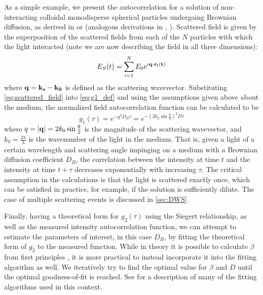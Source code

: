 As a simple example, we present the autocorrelation for a solution of non-interacting colloidal monodisperse spherical particles undergoing Brownian diffusion, as derived in \cite[ch. 16.2.2]{Brown1993} or \cite{Boas1997} (analogous derivations in \cite{BernePecora1976}, \cite{Schmitz1990}). Scattered field is given by the superposition of the scattered fields from each of the $N$ particles with which the light interacted (note we are now describing the field in all three dimensions):
\begin{equation} \label{eq:scattered_field}
E_S(t) = \sum_{i=1}^{N} E_0 e^{i\vb{q}\cdot\vb{r_i(t)}}
\end{equation}
where $\vb{q}=\vb{k_s}-\vb{k_0}$ is defined as the scattering wavevector. Substituting \autoref{eq:scattered_field} into \autoref{eq:g1_def} and using the assumptions given above about the medium, the normalized field autocorrelation function can be calculated to be 
\begin{equation} \label{eq:g1_dls}
g_1(\tau) = e^{-q^2 D_B \tau} = e^{-(2k_0\sin\frac{\theta}{2})^2 D \tau} 
\end{equation}
where $q=\abs{\vb{q}}=2k_0\sin\frac{\theta}{2}$ is the magnitude of the scattering wavevector, and $k_0 = \frac{2\pi}{\lambda}$ is the wavenumber of the light in the medium. That is, given a light of a certain wavelength and scattering angle impinging on a medium with a Brownian diffusion coefficient $D_B$, the correlation between the intensity at time $t$ and the intensity at time $t+\tau$ decreases exponentially with increasing $\tau$. The critical assumption in the calculations is that the light is scattered exactly once, which can be satisfied in practice, for example, if the solution is sufficiently dilute. The case of multiple scattering events is discussed in \autoref{sec:DWS}. 

Finally, having a theoretical form for $g_2(\tau)$ using the Siegert relationship, as well as the measured intensity autocorrelation function, we can attempt to estimate the parameters of interest, in this case $D_B$, by fitting the theoretical form of $g_2$ to the measured function. While in theory it is possible to calculate $\beta$ from first principles \cite[ch. 2.3.3.2]{Brown1993}, it is more practical to instead incorporate it into the fitting algorithm as well. We iteratively try to find the optimal value for $\beta$ and $D$ until the optimal goodness-of-fit is reached. See \cite[ch. 4.1,4.4]{Brown1993} for a description of many of the fitting algorithms used in this context. 


